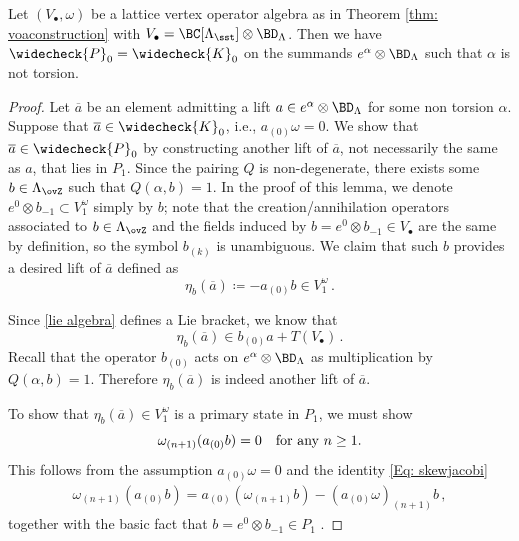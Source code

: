 \begin{proposition}
\notready\label{prop: primaryomegabracket}
Let $(V_\bullet, \omega)$ be a lattice vertex operator algebra as in Theorem \ref{thm: voaconstruction} with $V_\bullet=\BC[\Lambda_{\sst}]\otimes \BD_\Lambda$. Then we have $\widecheck{P}_0=\widecheck{K}_0$ on the summands $e^\alpha\otimes \BD_\Lambda$ such that $\alpha$ is not torsion.
\end{proposition}
\begin{proof}
Let $\overline{a}$ be an element admitting a lift $a\in e^\alpha\otimes \BD_\Lambda$ for some non torsion $\alpha$. Suppose that $\overline{a}\in \widecheck{K}_0$, i.e., $a_{(0)}\omega=0$. We show that $\overline{a}\in \widecheck{P}_0$ by constructing another lift of $\overline{a}$, not necessarily the same as $a$, that lies in $P_1$. Since the pairing $Q$ is non-degenerate, there exists some $b\in \Lambda_{\ovZ}$ such that $Q(\alpha,b)=1$. In the proof of this lemma, we denote $e^0\otimes b_{-1}\subset V_1^\omega$ simply by $b$; note that the creation/annihilation operators associated to $b\in \Lambda_{\ovZ}$ and the fields induced by $b=e^0\otimes b_{-1}\in V_\bullet$ are the same by definition, so the symbol $b_{(k)}$ is unambiguous. We claim that such $b$ provides a desired lift of $\overline{a}$ defined as
$$\eta_b(\overline{a})\coloneqq -a_{(0)}b\in V^\omega_1\,.
$$

Since \eqref{lie algebra} defines a Lie bracket, we know that
$$
    \eta_b(\overline{a}) \in b_{(0)}a+T(V_\bullet)\,.
$$
Recall that the operator $b_{(0)}$ acts on $e^\alpha\otimes \BD_\Lambda$ as multiplication by $Q(\alpha,b)=1$. Therefore $\eta_b(\overline{a})$ is indeed another lift of $\overline{a}$.

To show that $\eta_b(\overline{a})\in V^\omega_1$ is a primary state in $P_1$, we must show
$$\omega_{(n+1)}(a_{(0)}b)=0\quad  \textnormal{for any }  n\geq 1.
$$
This follows from the assumption $a_{(0)}\omega=0$ and the identity \eqref{Eq: skewjacobi}
\begin{align*}
    \omega_{(n+1)}(a_{(0)}b)
    =a_{(0)}(\omega_{(n+1)}b)-(a_{(0)}\omega)_{(n+1)}b\,,
\end{align*}
together with the basic fact that $b=e^0\otimes b_{-1}\in P_1$ \cite[page 81]{Ka98}.
\end{proof}
